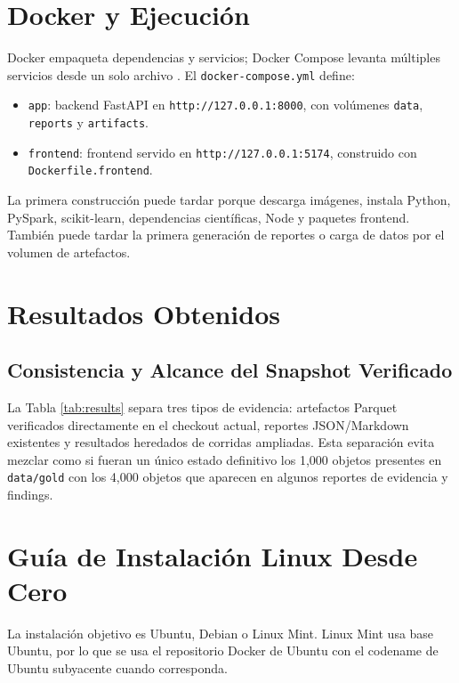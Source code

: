 \documentclass[12pt,a4paper]{report}
\newcommand{\code}[1]{\texttt{#1}}
\DeclareRobustCommand{\filepath}[1]{\nolinkurl{#1}}
\begin{document}
\chapter{Docker y Ejecución}

Docker empaqueta dependencias y servicios; Docker Compose levanta múltiples servicios desde un solo archivo \cite{docker_ubuntu,docker_debian,docker_compose}. El \filepath{docker-compose.yml} define:

\begin{itemize}
  \item \code{app}: backend FastAPI en \code{http://127.0.0.1:8000}, con volúmenes \code{data}, \code{reports} y \code{artifacts}.
  \item \code{frontend}: frontend servido en \code{http://127.0.0.1:5174}, construido con \code{Dockerfile.frontend}.
\end{itemize}

La primera construcción puede tardar porque descarga imágenes, instala Python, PySpark, scikit-learn, dependencias científicas, Node y paquetes frontend. También puede tardar la primera generación de reportes o carga de datos por el volumen de artefactos.

\chapter{Resultados Obtenidos}

\section{Consistencia y Alcance del Snapshot Verificado}

La Tabla \ref{tab:results} separa tres tipos de evidencia: artefactos Parquet verificados directamente en el checkout actual, reportes JSON/Markdown existentes y resultados heredados de corridas ampliadas. Esta separación evita mezclar como si fueran un único estado definitivo los 1,000 objetos presentes en \filepath{data/gold} con los 4,000 objetos que aparecen en algunos reportes de evidencia y findings.



\chapter{Guía de Instalación Linux Desde Cero}

La instalación objetivo es Ubuntu, Debian o Linux Mint. Linux Mint usa base Ubuntu, por lo que se usa el repositorio Docker de Ubuntu con el codename de Ubuntu subyacente cuando corresponda.
\end{document}
